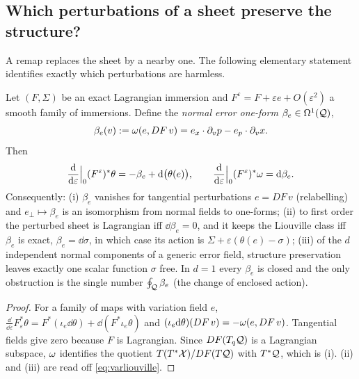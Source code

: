\subsection{Which perturbations of a sheet preserve the structure?}

A remap replaces the sheet by a nearby one. The following elementary statement identifies exactly which
perturbations are harmless.

\begin{proposition}\label{prop:normalform}
Let $(F,\Sigma)$ be an exact Lagrangian immersion and $F^\varepsilon=F+\varepsilon e+O(\varepsilon^2)$ a smooth family
of immersions. Define the \emph{normal error one-form} $\beta_e\in\Omega^1(\mathcal{Q})$,
\begin{equation}\label{eq:beta}
\beta_e(v):=\omega(e,DF\,v)=e_x\cdot\partial_vp-e_p\cdot\partial_vx .
\end{equation}
Then
\begin{equation}\label{eq:varliouville}
\frac{\mathrm{d}}{\mathrm{d}\varepsilon}\Big|_{0}(F^\varepsilon)^*\theta=-\beta_e+\mathrm{d}\big(\theta(e)\big),\qquad
\frac{\mathrm{d}}{\mathrm{d}\varepsilon}\Big|_{0}(F^\varepsilon)^*\omega=\mathrm{d}\beta_e .
\end{equation}
Consequently: (i) $\beta_e$ vanishes for tangential perturbations $e=DF\,v$ (relabelling) and
$e_\perp\mapsto\beta_e$ is an isomorphism from normal fields to one-forms; (ii) to first order the perturbed sheet is
Lagrangian iff $\dd\beta_e=0$, and it keeps the Liouville class iff $\beta_e$ is exact, $\beta_e=\dd\sigma$, in which case
its action is $\Sigma+\varepsilon(\theta(e)-\sigma)$; (iii) of the $d$ independent normal components of a generic
error field, structure preservation leaves exactly one scalar function $\sigma$ free. In $d=1$ every $\beta_e$ is
closed and the only obstruction is the single number $\oint_{\mathcal{Q}}\beta_e$ (the change of enclosed action).
\end{proposition}
\begin{proof}
For a family of maps with variation field $e$, $\frac{\dd}{\dd\varepsilon}F_\varepsilon^*\theta=F^*(\iota_e\dd\theta)+\dd(F^*\iota_e\theta)$
and $(\iota_e\mathrm{d}\theta)(DF\,v)=-\omega(e,DF\,v)$. Tangential fields give zero because $F$ is Lagrangian. Since $DF(T_q\mathcal{Q})$
is a Lagrangian subspace, $\omega$ identifies the quotient $T(T^*\mathcal{X})/DF(T\mathcal{Q})$ with $T^*\mathcal{Q}$, which is (i). (ii) and (iii)
are read off \eqref{eq:varliouville}.
\end{proof}

